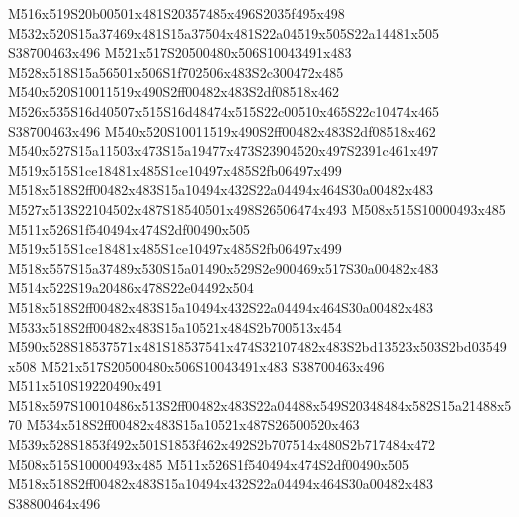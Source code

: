 \documentclass{article}
\begin{document}
\begin{multicols}{2}







M516x519S20b00501x481S20357485x496S2035f495x498 M532x520S15a37469x481S15a37504x481S22a04519x505S22a14481x505 S38700463x496 M521x517S20500480x506S10043491x483 M528x518S15a56501x506S1f702506x483S2c300472x485 M540x520S10011519x490S2ff00482x483S2df08518x462 M526x535S16d40507x515S16d48474x515S22c00510x465S22c10474x465 S38700463x496 M540x520S10011519x490S2ff00482x483S2df08518x462 M540x527S15a11503x473S15a19477x473S23904520x497S2391c461x497 M519x515S1ce18481x485S1ce10497x485S2fb06497x499 M518x518S2ff00482x483S15a10494x432S22a04494x464S30a00482x483 M527x513S22104502x487S18540501x498S26506474x493 M508x515S10000493x485 M511x526S1f540494x474S2df00490x505 M519x515S1ce18481x485S1ce10497x485S2fb06497x499 M518x557S15a37489x530S15a01490x529S2e900469x517S30a00482x483 M514x522S19a20486x478S22e04492x504 M518x518S2ff00482x483S15a10494x432S22a04494x464S30a00482x483 M533x518S2ff00482x483S15a10521x484S2b700513x454 M590x528S18537571x481S18537541x474S32107482x483S2bd13523x503S2bd03549x508 M521x517S20500480x506S10043491x483 S38700463x496 M511x510S19220490x491 M518x597S10010486x513S2ff00482x483S22a04488x549S20348484x582S15a21488x570 M534x518S2ff00482x483S15a10521x487S26500520x463 M539x528S1853f492x501S1853f462x492S2b707514x480S2b717484x472 M508x515S10000493x485 M511x526S1f540494x474S2df00490x505 M518x518S2ff00482x483S15a10494x432S22a04494x464S30a00482x483 S38800464x496


\end{multicols}
\end{document}
